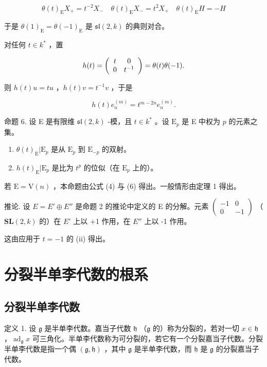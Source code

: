 \[
\theta (t) _ {\mathrm{E}} X _ {+} = t ^ {- 2} X _ {-} \quad \theta (t) _ {\mathrm{E}} X _ {-} = t ^ {2} X _ {+} \quad \theta (t) _ {\mathrm{E}} H = - H\tag{5}
\]

于是 \(\theta(1)_{\mathrm{E}} = \theta(-1)_{\mathrm{E}}\) 是 \(\mathfrak{sl}(2,k)\) 的典则对合。

对任何 \(t\in k^{*}\) ，置

\[
h (t) = \left( \begin{array}{c c} t & 0 \\ 0 & t ^ {- 1} \end{array} \right) = \theta (t) \theta (- 1).
\]

则 \(h(t)u = tu\) ，\(h(t)v = t^{-1}v\) ，于是

\[
h (t) e _ {n} ^ {(m)} = t ^ {m - 2 n} e _ {n} ^ {(m)}.\tag{6}
\]

命题 6. 设 E 是有限维 \(\mathfrak{sl}(2,k)\) -模，且 \(t\in k^{*}\) 。设 \(\mathrm{E}_p\) 是 E 中权为 \(p\) 的元素之集。

\begin{enumerate}
\def\labelenumi{(\roman{enumi})}
\item
  \(\theta(t)_{\mathrm{E}}|\mathrm{E}_{p}\) 是从 \(\mathrm{E}_p\) 到 \(\mathrm{E}_{-p}\) 的双射。
\item
  \(h(t)_{\mathrm{E}}|\mathrm{E}_p\) 是比为 \(t^p\) 的位似（在 \(\mathrm{E}_p\) 上的）。
\end{enumerate}

若 \(\mathrm{E} = \mathrm{V}(n)\) ，本命题由公式 (4) 与 (6) 得出。一般情形由定理 1 得出。

推论. 设 \(E = E' \oplus E''\) 是命题 2 的推论中定义的 E 的分解。元素 \(\begin{pmatrix}-1 & 0 \\ 0 & -1\end{pmatrix}\) （\(\mathbf{SL}(2, k)\) 的）在 \(E'\) 上以 +1 作用，在 \(E''\) 上以 -1 作用。

这由应用于 \(t = -1\) 的 (ii) 得出。

\section{分裂半单李代数的根系}

\subsection{分裂半单李代数}

定义 1. 设 \(\mathfrak{g}\) 是半单李代数。嘉当子代数 \(\mathfrak{h}\) （\(\mathfrak{g}\) 的）称为分裂的，若对一切 \(x \in \mathfrak{h}\) ，\(\operatorname{ad}_{\mathfrak{g}} x\) 可三角化。半单李代数称为可分裂的，若它有一个分裂嘉当子代数。分裂半单李代数是指一个偶 \((\mathfrak{g}, \mathfrak{h})\) ，其中 \(\mathfrak{g}\) 是半单李代数，而 \(\mathfrak{h}\) 是 \(\mathfrak{g}\) 的分裂嘉当子代数。

